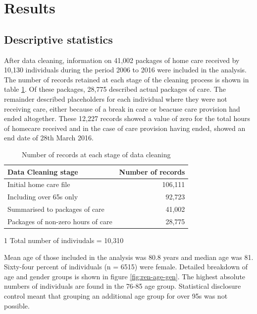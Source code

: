 \documentclass[]{article}
\begin{document}
\FloatBarrier

\section{Results}\label{sec:renf-results}

\subsection{Descriptive statistics}\label{subsec:renf-descriptives}

After data cleaning, information on 41,002 packages of home care
received by 10,130 individuals during the period 2006 to 2016 were
included in the analysis. The number of records retained at each stage
of the cleaning process is shown in table \ref{tab:renf-cleaning}. Of
these packages, 28,775 described actual packages of care. The remainder
described placeholders for each individual where they were not receiving
care, either because of a break in care or beacuse care provision had
ended altogether. These 12,227 records showed a value of zero for the
total hours of homecare received and in the case of care provision
having ended, showed an end date of 28th March 2016.

\begin{table}[h]
\centering
\caption{Number of records at each stage of data cleaning}
\label{tab:renf-cleaning}
\begin{threeparttable}
\begin{tabular}{@{}lr@{}}
\toprule
Data Cleaning stage                & Number of records \\ \midrule
Initial home care file             & 106,111           \\
Including over 65s only            & 92,723             \\
Summarised to packages of care     & 41,002\tnote{1}    \\ 
Packages of non-zero hours of care & 28,775             \\ \bottomrule
\end{tabular}
\begin{tablenotes}
\item[1] Total number of indiviudals = 10,310
\end{tablenotes}
\end{threeparttable}
\end{table}

Mean age of those included in the analysis was 80.8 years and median age
was 81. Sixty-four percent of individuals (n = 6515) were female.
Detailed breakdown of age and gender groups is shown in figure
\ref{fig:ren-age-gen}. The highest absolute numbers of individuals are
found in the 76-85 age group. Statistical disclosure control meant that
grouping an additional age group for over 95s was not possible.
\end{document}
